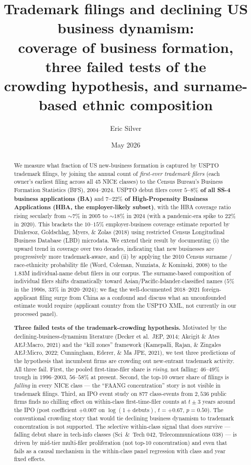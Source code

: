 \documentclass[11pt]{article}
\title{Trademark filings and declining US business dynamism:\\
coverage of business formation, three failed tests of the\\
crowding hypothesis, and surname-based ethnic composition}
\author{Eric Silver}
\affil{}
\date{May 2026}
\begin{document}
\maketitle

\begin{abstract}
We measure what fraction of US new-business formation is captured by
USPTO trademark filings, by joining the annual count of \emph{first-ever
trademark filers} (each owner's earliest filing across all 45 NICE
classes) to the Census Bureau's Business Formation Statistics (BFS),
2004--2024. USPTO debut filers cover \textbf{$5$--$8\%$ of all SS-4
business applications (BA)} and \textbf{$7$--$22\%$ of High-Propensity
Business Applications (HBA, the employer-likely subset)}, with the
HBA coverage ratio rising secularly from $\sim 7\%$ in 2005 to
$\sim 18\%$ in 2024 (with a pandemic-era spike to $22\%$ in 2020). This
brackets the $10$--$15\%$ employer-business coverage estimate reported
by Dinlersoz, Goldschlag, Myers, \& Zolas (2018) using restricted
Census Longitudinal Business Database (LBD) microdata. We extend
their result by documenting (i) the upward trend in coverage over
two decades, indicating that new businesses are progressively more
trademark-aware, and (ii) by applying the 2010 Census surname /
race-ethnicity probability file (Word, Coleman, Nunziata, \& Kominski,
2008) to the $1.83$M individual-name debut filers in our corpus. The
surname-based composition of individual filers shifts dramatically
toward Asian/Pacific-Islander-classified names ($5\%$ in the 1990s,
$33\%$ in 2020--2024); we flag the well-documented $2018$--$2021$
foreign-applicant filing surge from China as a confound and discuss
what an unconfounded estimate would require (applicant country from
the USPTO XML, not currently in our processed panel).

\textbf{Three failed tests of the trademark-crowding hypothesis.}
Motivated by the declining-business-dynamism literature
(Decker et al.\ JEP, 2014; Akcigit \& Ates AEJ:Macro, 2021) and the
``kill zones'' framework
(Kamepalli, Rajan, \& Zingales AEJ:Micro, 2022;
Cunningham, Ederer, \& Ma JPE, 2021), we test three predictions of
the hypothesis that incumbent firms are crowding out new-entrant
trademark activity. All three fail. First, the pooled
first-time-filer share is \emph{rising}, not falling: $46$--$49\%$
trough in $1996$--$2003$, $56$--$58\%$ at present. Second, the top-$10$
owner share of filings is \emph{falling} in every NICE class --- the
``FAANG concentration'' story is not visible in trademark filings.
Third, an IPO event study on $877$ class-events from $2{,}536$ public
firms finds no chilling effect on within-class first-time-filer
counts at $t\pm 3$ years around the IPO (post coefficient
$+0.007$ on $\log(1 + \text{debuts})$, $t = +0.67$, $p = 0.50$).
The conventional crowding story that would tie declining business
dynamism to trademark concentration is not supported. The selective
within-class signal that does survive --- falling debut share in
tech-info classes (Sci~\&~Tech $042$, Telecommunications $038$) ---
is driven by mid-tier multi-filer proliferation (not top-$10$
concentration) and even that fails as a causal mechanism in the
within-class panel regression with class and year fixed effects.
\end{abstract}
\end{document}
